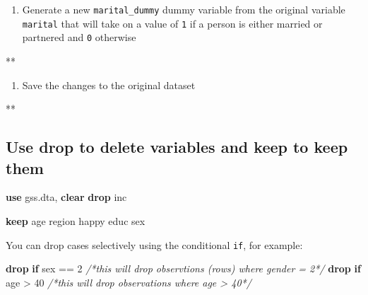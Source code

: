 \documentclass[
]{book}
\newenvironment{Shaded}{\begin{snugshade}}{\end{snugshade}}
\newcommand{\CommentTok}[1]{\textcolor[rgb]{0.56,0.35,0.01}{\textit{#1}}}
\newcommand{\KeywordTok}[1]{\textcolor[rgb]{0.13,0.29,0.53}{\textbf{#1}}}
\newcommand{\NormalTok}[1]{#1}
\providecommand{\tightlist}{%
  \setlength{\itemsep}{0pt}\setlength{\parskip}{0pt}}
\begin{document}
\begin{enumerate}
\def\labelenumi{\arabic{enumi}.}
\setcounter{enumi}{2}
\tightlist
\item
  Generate a new \texttt{marital\_dummy} dummy variable from the original variable \texttt{marital} that will take on a value of \texttt{1} if a person is either married or partnered and \texttt{0} otherwise
\end{enumerate}

\begin{Shaded}
\begin{Highlighting}[]
\NormalTok{**}
\end{Highlighting}
\end{Shaded}

\begin{enumerate}
\def\labelenumi{\arabic{enumi}.}
\setcounter{enumi}{3}
\tightlist
\item
  Save the changes to the original dataset
\end{enumerate}

\begin{Shaded}
\begin{Highlighting}[]
\NormalTok{**}
\end{Highlighting}
\end{Shaded}

\hypertarget{use-drop-to-delete-variables-and-keep-to-keep-them}{%
\subsection{Use drop to delete variables and keep to keep them}\label{use-drop-to-delete-variables-and-keep-to-keep-them}}

\begin{Shaded}
\begin{Highlighting}[]
\KeywordTok{use}\NormalTok{ gss.dta, }\KeywordTok{clear}
\KeywordTok{drop}\NormalTok{ inc}

\KeywordTok{keep}\NormalTok{ age region happy educ sex}
\end{Highlighting}
\end{Shaded}

You can drop cases selectively using the conditional \texttt{if}, for example:

\begin{Shaded}
\begin{Highlighting}[]
\KeywordTok{drop} \KeywordTok{if}\NormalTok{ sex == 2 }\CommentTok{/*this will drop observtions (rows) where gender = 2*/}
\KeywordTok{drop} \KeywordTok{if}\NormalTok{ age > 40 }\CommentTok{/*this will drop observations where age > 40*/}
\end{Highlighting}
\end{Shaded}
\end{document}
